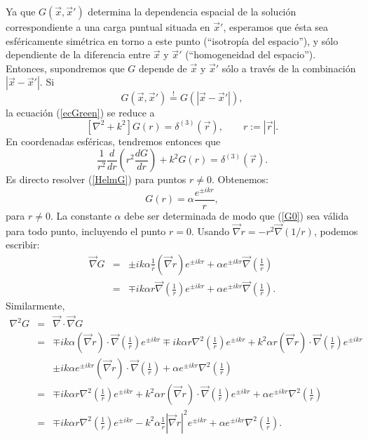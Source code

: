 Ya que $G(\vec{x},\vec{x}')$ determina la dependencia espacial de la solución correspondiente a una carga puntual situada en $\vec{x}'$, esperamos que ésta sea esféricamente simétrica en torno a este punto (``isotropía del espacio''), y sólo dependiente de la diferencia entre $\vec{x}$ y $\vec{x}'$ (``homogeneidad del espacio''). Entonces, supondremos que $G$ depende de $\vec{x}$ y $\vec{x}'$ sólo a través de la combinación $|\vec{x}-\vec{x}'|$. Si
\begin{equation}
G(\vec{x},\vec{x}')\stackrel{!}{=}G(|\vec{x}-\vec{x}'|),
\end{equation}
 la ecuación (\ref{ecGreen}) se reduce a
\begin{equation}
\left[ \nabla^2+k^2\right] G(r)=\delta^{(3)}(\vec{r}), \qquad r:=|\vec{r}|.
\end{equation}
En coordenadas esféricas, tendremos entonces que
\begin{equation}
 \frac{1}{r^2}\frac{d}{dr}\left( r^2\frac{dG}{dr}\right) +k^2G(r)=\delta^{(3)}(\vec{r})
.\label{HelmG}
\end{equation}
Es directo resolver (\ref{HelmG}) para puntos $r\neq 0$. Obtenemos:
\begin{equation}
G(r)=\alpha\frac{e^{\pm ikr}}{r}, \label{G0}
\end{equation}
para $r\neq 0$. La constante $\alpha$ debe ser determinada de modo que
(\ref{G0}) sea válida para todo punto, incluyendo el punto $r=0$. Usando
$\vec{\nabla}r=-r^2\vec{\nabla}\left({1}/{r}\right) $, podemos escribir:
\begin{eqnarray}
\vec{\nabla}G&=&\pm ik\alpha\frac{1}{r}\left( \vec{\nabla}r\right) e^{\pm
ikr}+\alpha e^{\pm ikr} \vec{\nabla}\left( \frac{1}{r}\right) \\
&=&\mp ik\alpha r\vec{\nabla}\left( \frac{1}{r}\right)  e^{\pm ikr}+\alpha
e^{\pm ikr} \vec{\nabla}\left( \frac{1}{r}\right) .
\end{eqnarray}
Similarmente,
\begin{eqnarray}
\nabla^2G&=&\vec{\nabla}\cdot \vec{\nabla}G \\
&=&\mp ik\alpha \left( \vec{\nabla}r\right)\cdot\vec{\nabla}\left(
\frac{1}{r}\right)  e^{\pm ikr}\mp ik\alpha r \nabla^2\left( \frac{1}{r}\right)
e^{\pm ikr}+k^2\alpha r\left( \vec{\nabla}r\right)\cdot\vec{\nabla}\left(
\frac{1}{r}\right)  e^{\pm ikr}\nonumber\\
&&\pm ik\alpha e^{\pm ikr} \left( \vec{\nabla}r\right)\cdot\vec{\nabla}\left(
\frac{1}{r}\right) +\alpha e^{\pm ikr}\nabla^2\left( \frac{1}{r}\right) \\
&=&\mp ik\alpha r \nabla^2\left( \frac{1}{r}\right)  e^{\pm ikr}+k^2\alpha
r\left( \vec{\nabla}r\right)\cdot\vec{\nabla}\left( \frac{1}{r}\right)  e^{\pm
ikr}+\alpha e^{\pm ikr}\nabla^2\left( \frac{1}{r}\right) \\
&=&\mp ik\alpha r \nabla^2\left( \frac{1}{r}\right)  e^{\pm ikr}-k^2\alpha
\frac{1}{r} \left|\vec{\nabla}r\right|^2  e^{\pm ikr}+\alpha e^{\pm
ikr}\nabla^2\left( \frac{1}{r}\right).
\end{eqnarray}
